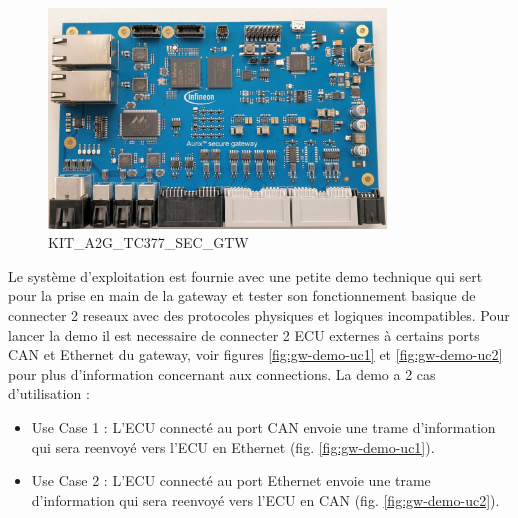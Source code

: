 \begin{figure}[!htb]
 \centering
 \includegraphics[width=0.8\textwidth]{img/secure-gateway.jpg}
 \caption{KIT\_A2G\_TC377\_SEC\_GTW}
 \label{fig:gw-photo}
\end{figure}

Le syst\`eme d'exploitation est fournie avec une petite demo technique qui sert pour la prise en main de la gateway et tester son fonctionnement basique de connecter 2 reseaux avec des protocoles physiques et logiques incompatibles. Pour lancer la demo il est necessaire de connecter 2 ECU externes \`a certains ports CAN et Ethernet du gateway, voir figures \ref{fig:gw-demo-uc1} et \ref{fig:gw-demo-uc2} pour plus d'information concernant aux connections. La demo a 2 cas d'utilisation :


\begin{itemize}
    \item Use Case 1 : L'ECU connect\'e au port CAN envoie une trame d'information qui sera reenvoy\'e vers l'ECU en Ethernet (fig. \ref{fig:gw-demo-uc1}).%
    \item Use Case 2 : L'ECU connect\'e au port Ethernet envoie une trame d'information qui sera reenvoy\'e vers l'ECU en CAN (fig. \ref{fig:gw-demo-uc2}).%
\end{itemize}

